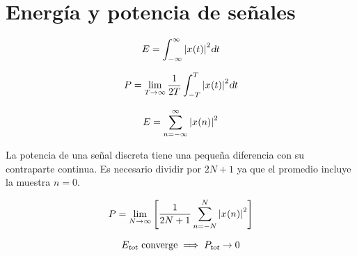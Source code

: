 \section{Energía y potencia de señales}

\begin{mdframed}[style=DefinitionFrame]
    \begin{defn}
    \end{defn}
    \begin{equation*}
        E = \int_{-\infty}^{\infty} \norm{\fx[x]{t}}^2 \dif t
    \end{equation*}
\end{mdframed}

\begin{mdframed}[style=DefinitionFrame]
    \begin{defn}
    \end{defn}
    \begin{equation*}
        P = \lim_{T \to \infty} \frac{1}{2T} \int_{-T}^{T} \norm{\fx[x]{t}}^2 \dif t
    \end{equation*}
\end{mdframed}

\begin{mdframed}[style=DefinitionFrame]
    \begin{defn}
    \end{defn}
    \begin{equation*}
        E = \sum_{n=-\infty}^{\infty} \norm{\fx[x]{n}}^2
    \end{equation*}
\end{mdframed}

La potencia de una señal discreta tiene una pequeña diferencia con su contraparte continua.
Es necesario dividir por $2N+1$ ya que el promedio incluye la muestra $n=0$.

\begin{mdframed}[style=DefinitionFrame]
    \begin{defn}
    \end{defn}
    \begin{equation*}
        P = \lim_{N \to \infty} \inBrackets{\displaystyle \frac{1}{2N+1} \displaystyle \sum_{n=-N}^{N} \norm{\fx[x]{n}}^2}
    \end{equation*}
\end{mdframed}

\begin{mdframed}[style=PropertyFrame]
    \begin{prop}
    \end{prop}
    \begin{equation*}
        \sub{E}{tot} \text{ converge} \implies \sub{P}{tot} \to 0
    \end{equation*}
\end{mdframed}

